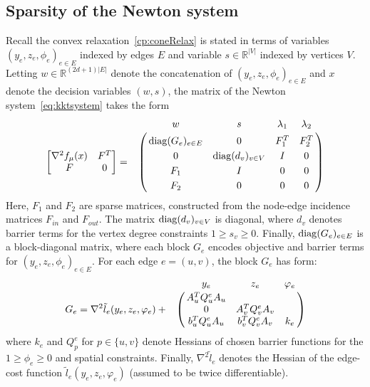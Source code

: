 \documentclass[letterpaper, 11pt]{article}
\begin{document}
\subsection{Sparsity of the Newton system}
Recall the convex relaxation~\eqref{cp:coneRelax} is stated in terms of variables
$(y_e, z_e, \phi_e)_{e \in E}$ indexed by edges $E$ and variable $s \in \mathbb{R}^{|V|}$ indexed by vertices $V$.
Letting $w \in \mathbb{R}^{(2d+1)|E|}$ denote the concatenation of $(y_e, z_e, \phi_e)_{e \in E}$
and $x$ denote the decision variables $(w, s)$, the matrix of the Newton system~\eqref{eq:kktsystem} takes the form
\begin{align}
  \begin{bmatrix}
    \nabla^2 f_\mu(x)  & F^T  \\
    F  & 0 
  \end{bmatrix} = 
  \bordermatrix{~& w & s & \lambda_1 & \lambda_2  \cr
  &  \diag(G_e)_{e \in E}  & 0  &  F_1^T & F_2^T  \cr
  &  0  & \diag(d_v)_{v \in V}   & I & 0\cr
  &  F_1  & I & 0  & 0 \cr
  &  F_2  & 0 & 0  & 0\cr
  }
\end{align}
Here,  $F_1$ and $F_2$ are sparse matrices, constructed from the node-edge incidence matrices $F_{in}$ and $F_{out}$.
The matrix $\operatorname*{diag}(d_v)_{v \in V}$ is diagonal, where $d_v$ denotes barrier terms for the vertex degree constraints $1 \ge s_v \ge 0$.
Finally, $\operatorname*{diag}(G_e)_{e \in E}$ is a block-diagonal matrix, 
where each block $G_e$ encodes objective and barrier terms for $(y_e, z_e, \phi_e)_{e \in E}$. For each edge $e=(u,v)$, the block $G_e$ has form:
\[
G_e =
\nabla^2 \tilde l_e(y_e, z_e, \varphi_e) +
  \bordermatrix{~& y_e & z_e & \varphi_e  \cr
&  A_u^T Q^e_u A_u  \cr
&    0          & A_v^T Q^e_v A_v \cr
&   b_u^T Q^e_u A_u    & b_v^T Q^e_v A_v      &  k_e  \cr
 }
\]
where $k_{e}$ and  $Q^e_p$ for $p \in \{u, v\}$ denote Hessians of chosen barrier functions
for the $1 \ge \phi_e \ge 0$ and spatial constraints.
Finally, $\nabla^2 \tilde l_e$ denotes the Hessian of  the edge-cost function $\tilde l_e(y_e, z_e, \varphi_e)$
(assumed to be twice differentiable).



\end{document}
